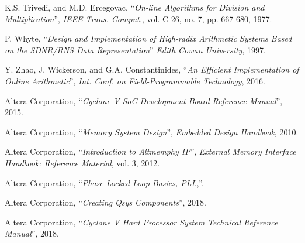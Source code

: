 \begin{thebibliography}{1}
  K.S. Trivedi, and M.D. Ercegovac,
  ``\textit{On-line Algorithms for Division and Multiplication}'',
  \textit{IEEE Trans. Comput.}, vol. C-26, no. 7, pp. 667-680,
  1977.

  P. Whyte,
  ``\textit{Design and Implementation of High-radix Arithmetic Systems Based
  on the SDNR/RNS Data Representation}''
  \textit{Edith Cowan University},
  1997.

  Y. Zhao, J. Wickerson, and G.A. Constantinides,
  ``\textit{An Efficient Implementation of Online Arithmetic}'',
  \textit{Int. Conf. on Field-Programmable Technology},
  2016.


  Altera Corporation,
  ``\textit{Cyclone V SoC Development Board Reference Manual}'',
  2015.

  Altera Corporation,
  ``\textit{Memory System Design}'',
  \textit{Embedded Design Handbook},
  2010.

  Altera Corporation,
  ``\textit{Introduction to Altmemphy IP}'',
  \textit{External Memory Interface Handbook: Reference Material}, vol. 3,
  2012.

  Altera Corporation,
  ``\textit{Phase-Locked Loop Basics, PLL},''.

  Altera Corporation,
  ``\textit{Creating Qsys Components}'',
  2018.

  Altera Corporation,
  ``\textit{Cyclone V Hard Processor System Technical Reference Manual}'',
  2018.


\end{thebibliography}
